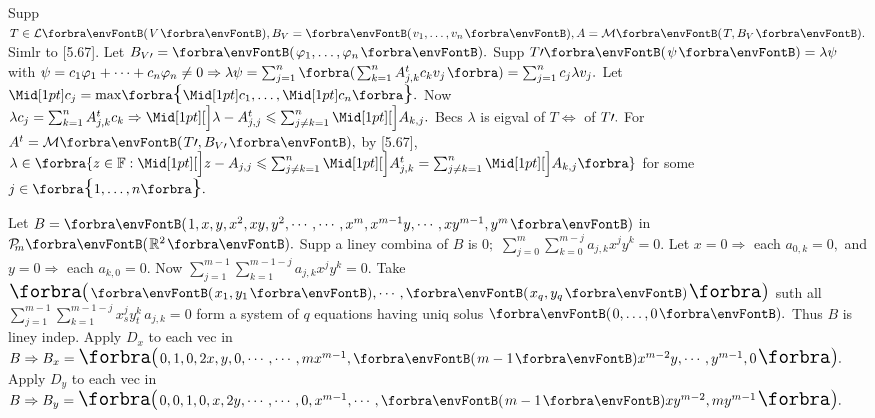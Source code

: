 Supp $T\in\Lm{V},B_V=\Par{v_1,\dots,v_n},A=\Mt{T,B_V}.$ Simlr to [5.67]. Let $B_{V\apostrophe}=\Par{\varphi_1,\dots,\varphi_n}.$\vspace{1.5pt}\parSol{}
Supp $T\apostrophe\Par{\psi}=\lambda\psi$ with $\psi=c_1\varphi_1+\dots+c_n\varphi_n\neq0\Rightarrow\lambda\psi=\sum_{j=1}^n\BigBigPar{{\sum_{k=1}^nA^t_{j,k}c_kv_j}}=\sum_{j=1}^nc_j\lambda v_j.$\vspace{3pt}\parSol{}
Let $\aMid{c_j}=\max\!\Bra{\aMid{c_1},\dots,\aMid{c_n}}.$ Now $\lambda c_j=\sum_{k=1}^nA^t_{j,k}c_k\Rightarrow\aXMid{\lambda-A^t_{j,j}}\leqslant\sum_{j\neq k=1}^n\aXMid{A_{k,j}}.$\PfEnd\vspace{6pt}\parSol{}
\Or Becs $\lambda$ is eigval of $T\Longleftrightarrow$ of $T\prime.$ For $A^t=\Mt{T\apostrophe,B_{V\apostrophe}},$ by [5.67],\vspace{1pt}\parSol{}
$\lambda\in\BigBra{z\in\Fbb:\aXMid{z-A_{j,j}}\leqslant\sum_{j\neq k=1}^n\aXMid{A^t_{j,k}}=\sum_{j\neq k=1}^n\aXMid{A_{k,j}}}$ for some $j\in\Bra{1,\dots,n}.$\PfEnd
\SepLine

\ChEnd


\vspace{4pt}


Let $B=\Par{1,x,y,x^2,xy,y^2,\cdots,\cdots,x^m,x^{m-1}y,\cdots,xy^{m-1},y^m}$ in $\PoFx{m}{\Rbb^2}.$\parSol{}
Supp a liney combina of $B$ is $0;$ \;$\sum_{j=0}^m\sum_{k=0}^{m-j}a_{j,k}x^jy^k=0.$\parSol{}
Let $x=0\Rightarrow$ each $a_{0,k}=0,$ and $y=0\Rightarrow$ each $a_{k,0}=0.$ Now $\sum_{j=1}^{m-1}\sum_{k=1}^{m-1-j}a_{j,k}x^jy^k=0.$\parSol{}
Take $\BigPar{\Par{x_1,y_1},\cdots,\Par{x_q,y_q}}$  suth all $\sum_{j=1}^{m-1}\sum_{k=1}^{m-1-j}x_s^jy_t^k\,a_{j,k}=0$\parSol{}
form a system of $q$ equations having uniq solus $\Par{0,\dots,0}.$ Thus $B$ is liney indep.\parSol{}
Apply $D_x$ to each vec in $B\Rightarrow B_x=\BigPar{0,1,0,2x,y,0,\cdots,\cdots,mx^{m-1},\Par{m-1}x^{m-2}y,\cdots,y^{m-1},0}.$\parSol{}
Apply $D_y$ to each vec in $B\Rightarrow B_y=\BigPar{0,0,1,0,x,2y,\cdots,\cdots,0,x^{m-1},\cdots,\Par{m-1}xy^{m-2},my^{m-1}}.$\PfEnd
\SepLine

